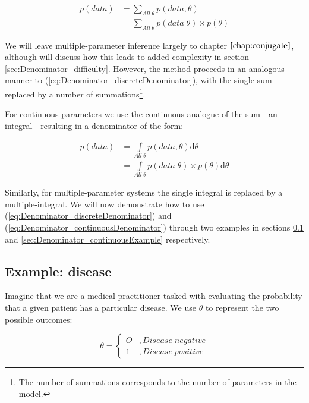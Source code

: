 \documentclass[11pt,fullpage]{book}
\begin{document}
\begin{equation}\label{eq:Denominator_discreteDenominator}
\begin{align}
p(data) &= \sum\limits_{All\;\theta} p(data,\theta)\\ 
&= \sum\limits_{All\;\theta} p(data|\theta) \times p(\theta)
\end{align}
\end{equation}

We will leave multiple-parameter inference largely to chapter $\ref{chap:conjugate}$, although will discuss how this leads to added complexity in section \ref{sec:Denominator_difficulty}. However, the method proceeds in an analogous manner to (\ref{eq:Denominator_discreteDenominator}), with the single sum replaced by a number of summations\footnote{The number of summations corresponds to the number of parameters in the model.}.

For continuous parameters we use the continuous analogue of the sum - an integral - resulting in a denominator of the form:

\begin{equation}\label{eq:Denominator_continuousDenominator}
\begin{align}
p(data) &= \int\limits_{All\;\theta} p(data,\theta) \mathrm{d}\theta\\
&= \int\limits_{All\;\theta} p(data|\theta) \times p(\theta) \mathrm{d}\theta
\end{align}
\end{equation}

Similarly, for multiple-parameter systems the single integral is replaced by a multiple-integral. We will now demonstrate how to use (\ref{eq:Denominator_discreteDenominator}) and (\ref{eq:Denominator_continuousDenominator}) through two examples in sections \ref{sec:Denominator_discreteExample} and \ref{sec:Denominator_continuousExample} respectively.

\subsection{Example: disease}\label{sec:Denominator_discreteExample}
Imagine that we are a medical practitioner tasked with evaluating the probability that a given patient has a particular disease. We use $\theta$ to represent the two possible outcomes: 

\begin{equation}
\theta =
\begin{cases}
O & , Disease \; negative \\
1 & ,  Disease \; positive
\end{cases}
\end{equation}
\end{document}
